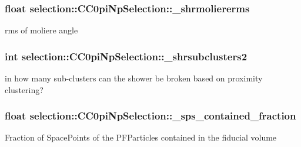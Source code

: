 \subsubsection[{\texorpdfstring{\+\_\+shrmoliererms}{_shrmoliererms}}]{\setlength{\rightskip}{0pt plus 5cm}float selection\+::\+C\+C0pi\+Np\+Selection\+::\+\_\+shrmoliererms\hspace{0.3cm}{\ttfamily [private]}}\hypertarget{classselection_1_1CC0piNpSelection_a4fbd21a7fae1f01027cfe234e925c19a}{}\label{classselection_1_1CC0piNpSelection_a4fbd21a7fae1f01027cfe234e925c19a}
rms of moliere angle 
\subsubsection[{\texorpdfstring{\+\_\+shrsubclusters2}{_shrsubclusters2}}]{\setlength{\rightskip}{0pt plus 5cm}int selection\+::\+C\+C0pi\+Np\+Selection\+::\+\_\+shrsubclusters2\hspace{0.3cm}{\ttfamily [private]}}\hypertarget{classselection_1_1CC0piNpSelection_af7e0f3d1bd6c4335353bd8d4054d4e1e}{}\label{classselection_1_1CC0piNpSelection_af7e0f3d1bd6c4335353bd8d4054d4e1e}
in how many sub-\/clusters can the shower be broken based on proximity clustering? 
\subsubsection[{\texorpdfstring{\+\_\+sps\+\_\+contained\+\_\+fraction}{_sps_contained_fraction}}]{\setlength{\rightskip}{0pt plus 5cm}float selection\+::\+C\+C0pi\+Np\+Selection\+::\+\_\+sps\+\_\+contained\+\_\+fraction\hspace{0.3cm}{\ttfamily [private]}}\hypertarget{classselection_1_1CC0piNpSelection_ac425fa284847d7cae95f21367ed4889e}{}\label{classselection_1_1CC0piNpSelection_ac425fa284847d7cae95f21367ed4889e}
Fraction of Space\+Points of the P\+F\+Particles contained in the fiducial volume 
